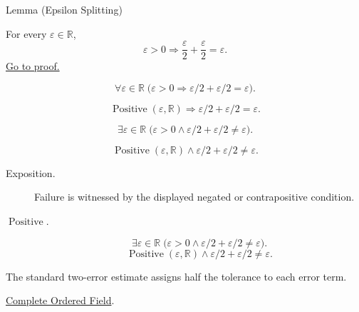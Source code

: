 \begin{lemmabox}{Lemma (Epsilon Splitting)}
\begin{lemma}
\label{lem:epsilon-splitting}
For every $\varepsilon\in\mathbb{R}$,
\[
  \varepsilon>0
  \Longrightarrow
  \frac{\varepsilon}{2}+\frac{\varepsilon}{2}=\varepsilon.
\]
\hyperref[prf:epsilon-splitting]{Go to proof.}
\end{lemma}
\end{lemmabox}
\begin{remark*}
\[
\forall \varepsilon\in\mathbb{R}\;\bigl(\varepsilon>0\Longrightarrow
\varepsilon/2+\varepsilon/2=\varepsilon\bigr).
\]
\end{remark*}
\begin{remark*}
\[
\operatorname{Positive}(\varepsilon,\mathbb{R})\Longrightarrow
\varepsilon/2+\varepsilon/2=\varepsilon.
\]
\end{remark*}
\begin{remark*}
\[
\exists\varepsilon\in\mathbb{R}\;\bigl(\varepsilon>0\land
\varepsilon/2+\varepsilon/2\ne\varepsilon\bigr).
\]
\end{remark*}
\begin{remark*}
\[
\operatorname{Positive}(\varepsilon,\mathbb{R})\land
\varepsilon/2+\varepsilon/2\ne\varepsilon.
\]
\end{remark*}

\begin{remark*}
\begin{description}
  \item[Exposition.]
  Failure is witnessed by the displayed negated or contrapositive condition.

  \item[\(\operatorname{Positive}.\)]
  \[
\exists\varepsilon\in\mathbb{R}\;\bigl(\varepsilon>0\land
\varepsilon/2+\varepsilon/2\ne\varepsilon\bigr).
\]
\[
\operatorname{Positive}(\varepsilon,\mathbb{R})\land
\varepsilon/2+\varepsilon/2\ne\varepsilon.
\]
\end{description}
\end{remark*}
\begin{remark*}[Interpretation]
The standard two-error estimate assigns half the tolerance to each error term.
\end{remark*}
\begin{dependencies}
\hyperref[def:real-ordered-field]{Complete Ordered Field}.
\end{dependencies}

